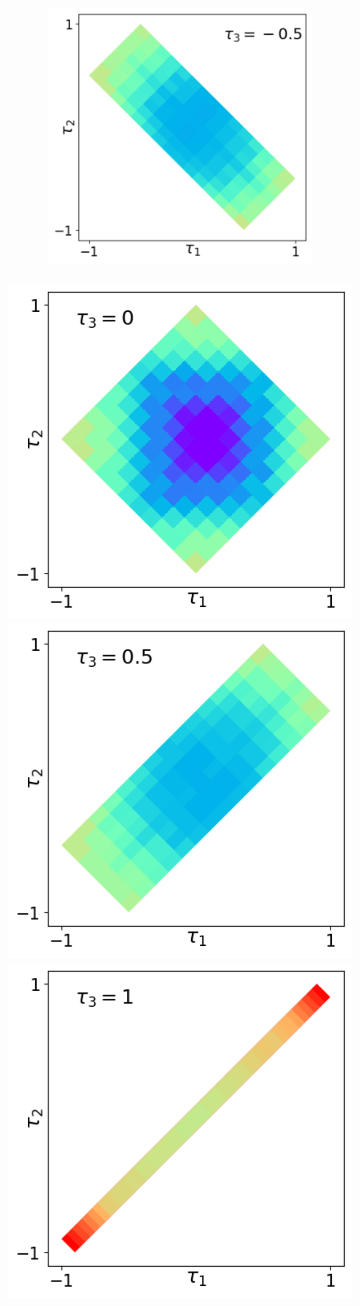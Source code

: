 \documentclass[varwidth, border=10pt]{standalone}
\begin{document}
\begin{figure}
\begin{subfigure}{0.9\textwidth}
\begin{subfigure}{.333\textwidth}
\includegraphics[width=.95\columnwidth]{corte2-2.pdf} \\
\end{subfigure}
\includegraphics[width=.322\columnwidth]{corte3-2.pdf}
\includegraphics[width=.322\columnwidth]{corte4-2.pdf}
\includegraphics[width=.322\columnwidth]{corte5-2.pdf}

\end{subfigure}
\end{figure}
\end{document}
